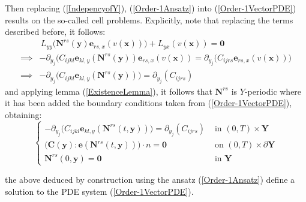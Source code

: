 Then replacing (\ref{IndepencyofY}), (\ref{Order-1Ansatz}) into (\ref{Order-1VectorPDE}) results on the so-called cell problems. Explicitly, note that replacing the terms described before, it follows:
\begin{align*}
    &\,L_{yy} \big( \mathbf{N}^{rs} (\mathbf{y}) \mathbf{e}_{rs,x} (v(\mathbf{x})) \big) + L_{yx}(v(\mathbf{x}) ) = \mathbf{0} \\
    \implies& -\partial_{y_j} \big( C_{ijkl}\mathbf{e}_{kl,y}(\mathbf{N}^{rs}(\mathbf{y}) ) \mathbf{e}_{rs,x}(v(\mathbf{x})) = \partial_{y_j} \big( C_{ijrs}\mathbf{e}_{rs,x}(v(\mathbf{x})) \big) \\
    \implies& - \partial_{y_j} \big( C_{ijkl} \mathbf{e}_{kl,y} (\mathbf{N}^{rs}(\mathbf{y})) \big) = \partial_{y_j} (C_{ijrs})
\end{align*}
and applying lemma (\ref{ExistenceLemma}), it follows that $\mathbf{N}^{rs}$ is $Y$-periodic where it has been added the boundary conditions taken from (\ref{Order-1VectorPDE}), obtaining:
\begin{equation*}
    \left \{
    \begin{array}{cc}
         - \partial_{y_j} \big( C_{ijkl} \mathbf{e}_{kl,y} (\mathbf{N}^{rs}(t,\mathbf{y})) \big) = \partial_{y_j} (C_{ijrs}) & \text{ in } (0,T)\times \mathbf{Y} \\
        \big( \mathbf{C}(\mathbf{y}) : \mathbf{e}(\mathbf{N}^{rs}(t,\mathbf{y})) \big) \cdot n = \mathbf{0} & \text{ on } (0,T)\times \partial \mathbf{Y}\\
        \mathbf{N}^{rs} (0, \mathbf{y}) = \mathbf{0} &  \text{ in } \mathbf{Y}
    \end{array}
    \right.
\end{equation*}

the above deduced by construction using the ansatz (\ref{Order-1Ansatz}) define a solution to the PDE system (\ref{Order-1VectorPDE}).

